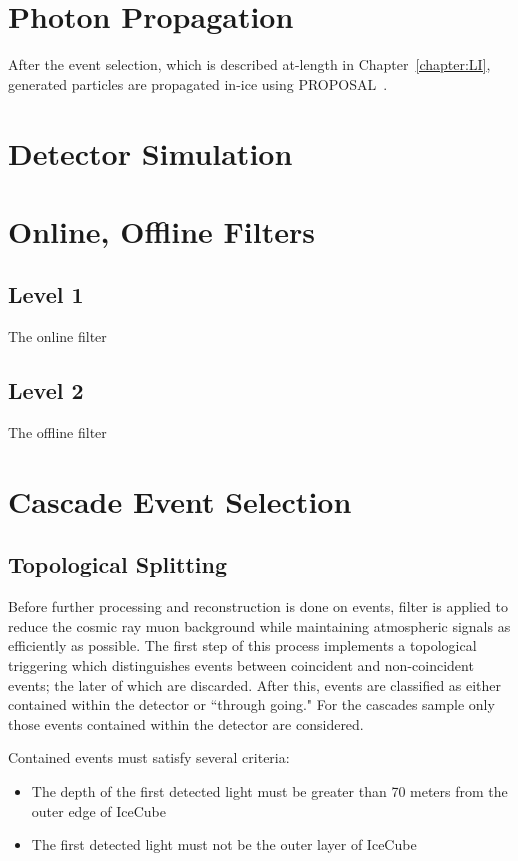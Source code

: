\documentclass[main.tex]{subfiles}
\begin{document}
\section{Photon Propagation}

After the event selection, which is described at-length in Chapter~\ref{chapter:LI}, generated particles are propagated in-ice using PROPOSAL~\cite{Koehne:2013gpa}. 

\section{Detector Simulation}

\section{Online, Offline Filters}

\subsection{Level 1}

The online filter

\subsection{Level 2}

The offline filter 


\section{Cascade Event Selection}

\subsection{Topological Splitting}

Before further processing and reconstruction is done on events, filter is applied to reduce the cosmic ray muon background while maintaining atmospheric signals as efficiently as possible. 
The first step of this process implements a topological triggering which distinguishes events between coincident and non-coincident events; the later of which are discarded. 
After this, events are classified as either contained within the detector or ``through going." For the cascades sample only those events contained within the detector are considered. 

Contained events must satisfy several criteria:
\begin{itemize}
    \item The depth of the first detected light must be greater than 70 meters from the outer edge of IceCube
    \item The first detected light must not be the outer layer of IceCube
\end{itemize}
\end{document}
